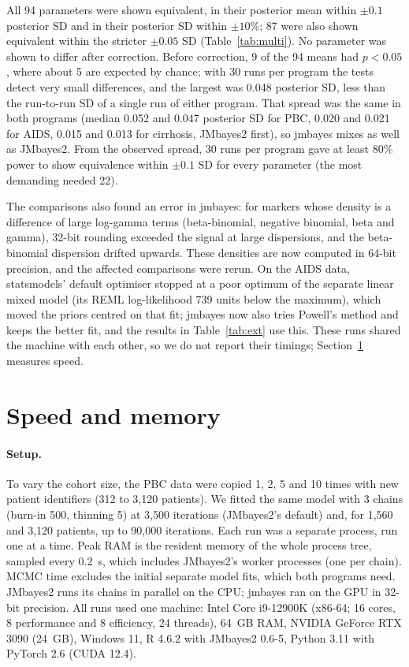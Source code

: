 \documentclass[11pt]{article}
\begin{document}
All 94 parameters were shown equivalent, in their posterior mean within $\pm 0.1$
posterior SD and in their posterior SD within $\pm 10\%$; 87 were also shown
equivalent within the stricter $\pm 0.05$ SD (Table~\ref{tab:multi}). No parameter was
shown to differ after correction. Before correction, 9 of the 94 means had
$p < 0.05$, where about 5 are expected by chance; with 30 runs per
program the tests detect very small differences, and the largest was 0.048 posterior
SD, less than the run-to-run SD of a single run of either program. That spread was the same
in both programs (median 0.052 and 0.047 posterior SD for PBC,
0.020 and 0.021 for AIDS, 0.015 and
0.013 for cirrhosis, JMbayes2 first), so jmbayes mixes as well as
JMbayes2. From the observed spread, 30 runs per program gave at least 80\% power to show
equivalence within $\pm 0.1$ SD for every parameter (the most demanding needed 22).



The comparisons also found an error in jmbayes: for markers whose density is a difference of
large log-gamma terms (beta-binomial, negative binomial, beta and gamma), 32-bit rounding
exceeded the signal at large dispersions, and the beta-binomial dispersion drifted
upwards. These densities are now computed in 64-bit precision, and the affected
comparisons were rerun. On the AIDS data, statsmodels' default optimiser stopped at a poor
optimum of the separate linear mixed model (its REML log-likelihood 739 units below the
maximum), which moved the priors centred on that fit; jmbayes now also tries Powell's
method and keeps the better fit, and the results in Table~\ref{tab:ext} use this. These runs shared the machine with each other, so we do not report
their timings; Section~\ref{sec:bench} measures speed.



\section{Speed and memory}\label{sec:bench}

\paragraph{Setup.} To vary the cohort size, the PBC data were copied 1, 2, 5 and 10 times
with new patient identifiers (312 to 3,120 patients). We fitted the same model with 3
chains (burn-in 500, thinning 5) at 3,500 iterations (JMbayes2's default) and, for 1,560
and 3,120 patients, up to 90,000 iterations. Each run was a separate process, run one at a
time. Peak RAM is the resident memory of the whole process tree, sampled every 0.2~s, which
includes JMbayes2's worker processes (one per chain). MCMC time excludes the initial
separate model fits, which both programs need. JMbayes2 runs its chains in parallel on the
CPU; jmbayes ran on the GPU in 32-bit precision. All runs used one machine: Intel Core
i9-12900K (x86-64; 16 cores, 8 performance and 8 efficiency, 24 threads), 64~GB RAM, NVIDIA
GeForce RTX 3090 (24~GB), Windows 11, R 4.6.2 with JMbayes2 0.6-5, Python 3.11 with PyTorch
2.6 (CUDA 12.4).
\end{document}
